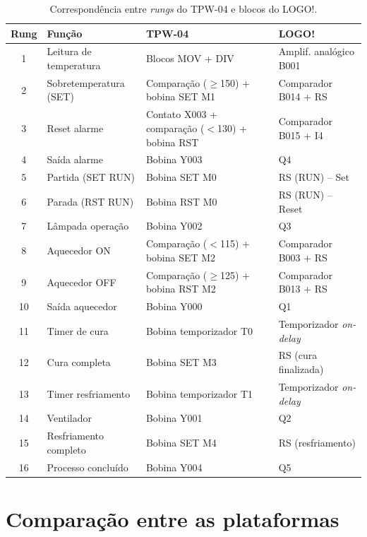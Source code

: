 \documentclass[
  12pt,
  openright,
  oneside,
  a4paper,
  chapter=TITLE,
  section=TITLE,
  brazilian
]{abntex2}
\begin{document}
\begin{table}[htbp]
\centering
\caption{Correspond\^{e}ncia entre \textit{rungs} do TPW-04 e blocos do LOGO!.}
\label{tab:rungs}
\small
\begin{tabular}{clll}
\toprule
\textbf{Rung} & \textbf{Fun\c{c}\~{a}o} & \textbf{TPW-04} & \textbf{LOGO!} \\
\midrule
1  & Leitura de temperatura    & Blocos MOV + DIV         & Amplif. anal\'{o}gico B001 \\
2  & Sobretemperatura (SET)    & Compara\c{c}\~{a}o ($\geq$150) + bobina SET M1  & Comparador B014 + RS \\
3  & Reset alarme              & Contato X003 + compara\c{c}\~{a}o ($<$130) + bobina RST & Comparador B015 + I4 \\
4  & Sa\'{i}da alarme               & Bobina Y003         & Q4 \\
5  & Partida (SET RUN)         & Bobina SET M0           & RS (RUN) -- Set \\
6  & Parada (RST RUN)          & Bobina RST M0           & RS (RUN) -- Reset \\
7  & L\^{a}mpada opera\c{c}\~{a}o          & Bobina Y002         & Q3 \\
8  & Aquecedor ON              & Compara\c{c}\~{a}o ($<$115) + bobina SET M2   & Comparador B003 + RS \\
9  & Aquecedor OFF             & Compara\c{c}\~{a}o ($\geq$125) + bobina RST M2  & Comparador B013 + RS \\
10 & Sa\'{i}da aquecedor            & Bobina Y000         & Q1 \\
11 & Timer de cura             & Bobina temporizador T0  & Temporizador \textit{on-delay} \\
12 & Cura completa             & Bobina SET M3           & RS (cura finalizada) \\
13 & Timer resfriamento        & Bobina temporizador T1  & Temporizador \textit{on-delay} \\
14 & Ventilador                & Bobina Y001         & Q2 \\
15 & Resfriamento completo     & Bobina SET M4           & RS (resfriamento) \\
16 & Processo conclu\'{i}do         & Bobina Y004         & Q5 \\
\bottomrule
\end{tabular}
\end{table}

\clearpage
\section{Compara\c{c}\~{a}o entre as plataformas}
\end{document}
